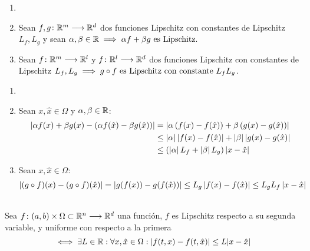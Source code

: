 \begin{prop}
	\begin{enumerate}
		\item[]
		\item Sean $f, g \colon \mathbb{R}^m \longrightarrow \mathbb{R}^d$ dos funciones Lipschitz con constantes de Lipschitz $L_f, L_g$ y sean $\alpha, \beta \in \mathbb{R} \implies \alpha f + \beta g \text{ es Lipschitz.}$
		\item Sean $f \colon \mathbb{R}^m \longrightarrow \mathbb{R}^l$ y $f \colon \mathbb{R}^l \longrightarrow \mathbb{R}^d$ dos funciones Lipschitz con constantes de Lipschitz $L_f, L_g \implies g\circ f \text{ es Lipschitz con constante } L_fL_g$.
	\end{enumerate}
	\begin{dem}
		\begin{enumerate}
			\item[]
			\item Sean $x, \hat{x} \in \Omega$ y $\alpha, \beta \in \mathbb{R}$:
			      \[\begin{aligned}
					      \left|\alpha f(x) + \beta g(x) - \left(\alpha f(\hat{x}) - \beta g(\hat{x})\right)\right| & = \left|\alpha\left(f(x) - f(\hat{x})\right) + \beta\left(g(x) - g(\hat{x})\right)\right| \\
					                                                                                         & \leq \left|\alpha\right|\left|f(x) - f(\hat{x})\right| + \left|\beta\right|\left|g(x) - g(\hat{x})\right|      \\
					                                                                                         & \leq \left(\left|\alpha\right|L_f + \left|\beta\right|L_g \right)\left|x-\hat{x}\right|
				      \end{aligned}\]
			\item Sean $x, \hat{x} \in \Omega$:
			      \[\left|(g \circ f)(x) - (g \circ f)(\hat{x}) \right| = \left|g(f(x)) - g(f(\hat{x}))\right| \leq L_g\left|f(x)-f(\hat{x})\right| \leq L_gL_f\left|x-\hat{x}\right|\]
		\end{enumerate}
	\end{dem}
\end{prop}
\begin{defn}  \mbox{} \\
	Sea $f \colon (a,b)\times \Omega \subset \mathbb{R}^n \longrightarrow \mathbb{R}^d$ una función, $f$ es Lipschitz respecto a su segunda variable, y uniforme con respecto a la primera
	\[\iff \exists L \in \mathbb{R} : \forall x, \hat{x} \in \Omega : |f(t,x)-f(t,\hat{x})| \leq L |x-\hat{x}|\]
\end{defn}

